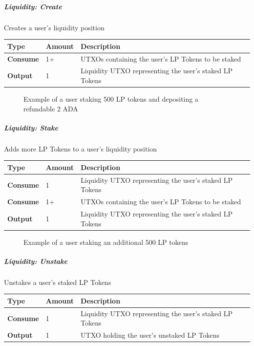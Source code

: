 \documentclass{article}
\begin{document}
\begin{sloppypar}
\hypertarget{liquidity-create}{%
\subparagraph{Liquidity: Create}\label{liquidity-create}}

Creates a user's liquidity position

\begin{tabularx}{\linewidth}{l|l|L}
\toprule
\textbf{Type} & \textbf{Amount} & \textbf{Description}
\tabularnewline
\midrule
\endhead
\textbf{Consume} & 1+ & UTXOs containing the user's LP Tokens to be
staked
\tabularnewline
\midrule
\textbf{Output} & 1 & Liquidity UTXO representing the user's staked LP
Tokens
\tabularnewline
\bottomrule
\end{tabularx}

\hypertarget{liquidity-create-figure}{%
\begin{figure}[htbp]
\centering

\caption{Example of a user staking 500 LP tokens and depositing a
refundable 2 ADA}
\label{liquidity-create-figure}
\end{figure}}

\hypertarget{liquidity-stake}{%
\subparagraph{Liquidity: Stake}\label{liquidity-stake}}

Adds more LP Tokens to a user's liquidity position

\begin{tabularx}{\linewidth}{l|l|L}
\toprule
\textbf{Type} & \textbf{Amount} & \textbf{Description}
\tabularnewline
\midrule
\endhead
\textbf{Consume} & 1 & Liquidity UTXO representing the user's staked LP
Tokens
\tabularnewline
\midrule
\textbf{Consume} & 1+ & UTXOs containing the user's LP Tokens to be
staked
\tabularnewline
\midrule
\textbf{Output} & 1 & Liquidity UTXO representing the user's staked LP
Tokens
\tabularnewline
\bottomrule
\end{tabularx}

\hypertarget{liquidity-update-figure}{%
\begin{figure}[htbp]
\centering

\caption{Example of a user staking an additional 500 LP tokens}
\label{liquidity-update-figure}
\end{figure}}

\hypertarget{liquidity-unstake}{%
\subparagraph{Liquidity: Unstake}\label{liquidity-unstake}}

Unstakes a user's staked LP Tokens

\begin{tabularx}{\linewidth}{l|l|L}
\toprule
\textbf{Type} & \textbf{Amount} & \textbf{Description}
\tabularnewline
\midrule
\endhead
\textbf{Consume} & 1 & Liquidity UTXO representing the user's staked LP
Tokens
\tabularnewline
\midrule
\textbf{Output} & 1 & UTXO holding the user's unstaked LP
Tokens
\tabularnewline
\bottomrule
\end{tabularx}


\end{sloppypar}
\end{document}
